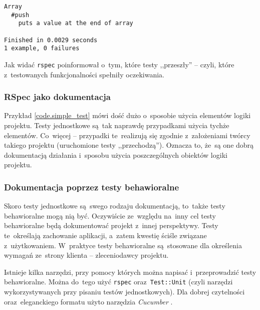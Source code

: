 \begin{lstlisting}[label={code.test_pretty}]
Array
  #push
    puts a value at the end of array

Finished in 0.0029 seconds
1 example, 0 failures
\end{lstlisting}

Jak widać \texttt{rspec} poinformował o~tym, które testy ,,przeszły'' -- czyli, które z~testowanych funkcjonalności spełniły oczekiwania.

\subsubsection{RSpec jako dokumentacja}

Przykład \ref{code.simple_test} mówi dość dużo o~sposobie użycia elementów logiki projektu. Testy jednostkowe są~tak naprawdę przypadkami użycia tychże elementów. Co~więcej -- przypadki te~realizują się zgodnie z~założeniami twórcy takiego projektu (uruchomione testy ,,przechodzą''). Oznacza to, że~są one dobrą dokumentacją działania i~sposobu użycia poszczególnych obiektów logiki projektu.

\subsubsection{Dokumentacja poprzez testy behawioralne} \label{dokumentacja.cucumber}

Skoro testy jednostkowe są~swego rodzaju dokumentacją, to~także testy behawioralne mogą nią być. Oczywiście ze~względu na~inny cel testy behawioralne będą dokumentować projekt z~innej perspektywy. Testy te~określają zachowanie aplikacji, a~zatem kwestię ściśle związane z~użytkowaniem. W~praktyce testy behawioralne są~stosowane dla określenia wymagań ze~strony klienta -- zleceniodawcy projektu.


Istnieje kilka narzędzi, przy pomocy których można napisać i~przeprowadzić testy behawioralne. Można do~tego użyć \texttt{rspec} oraz~\texttt{Test::Unit} (czyli narzędzi wykorzystywanych przy pisaniu testów jednostkowych). Dla dobrej czytelności oraz~eleganckiego formatu użyto narzędzia \textit{Cucumber} \cite{cucumber}.
